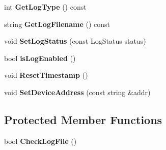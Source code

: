 \begin{DoxyCompactItemize}
\item 
\hypertarget{class_logger_aca399821afdcdc5913b56c7a1180399f}{int {\bfseries \-Get\-Log\-Type} () const }\label{class_logger_aca399821afdcdc5913b56c7a1180399f}

\item 
\hypertarget{class_logger_a17657ebe893d22cf1052448785123651}{string {\bfseries \-Get\-Log\-Filename} () const }\label{class_logger_a17657ebe893d22cf1052448785123651}

\item 
\hypertarget{class_logger_a2b697478ebf7af4cc87cd874a1da740c}{void {\bfseries \-Set\-Log\-Status} (const \-Log\-Status status)}\label{class_logger_a2b697478ebf7af4cc87cd874a1da740c}

\item 
\hypertarget{class_logger_a9c698f7ca23bf3ed8c33b95626f3d3ac}{bool {\bfseries is\-Log\-Enabled} ()}\label{class_logger_a9c698f7ca23bf3ed8c33b95626f3d3ac}

\item 
\hypertarget{class_logger_a7cc0f69aa4a1b166a2fc5995d07854f7}{void {\bfseries \-Reset\-Timestamp} ()}\label{class_logger_a7cc0f69aa4a1b166a2fc5995d07854f7}

\item 
\hypertarget{class_logger_af050a335c60943edfc6a20661ce4fb0d}{void {\bfseries \-Set\-Device\-Address} (const string \&addr)}\label{class_logger_af050a335c60943edfc6a20661ce4fb0d}

\end{DoxyCompactItemize}
\subsection*{\-Protected \-Member \-Functions}
\begin{DoxyCompactItemize}
\item 
\hypertarget{class_logger_adeb4634aa851e28223a009ea084151ad}{bool {\bfseries \-Check\-Log\-File} ()}\label{class_logger_adeb4634aa851e28223a009ea084151ad}

\end{DoxyCompactItemize}
